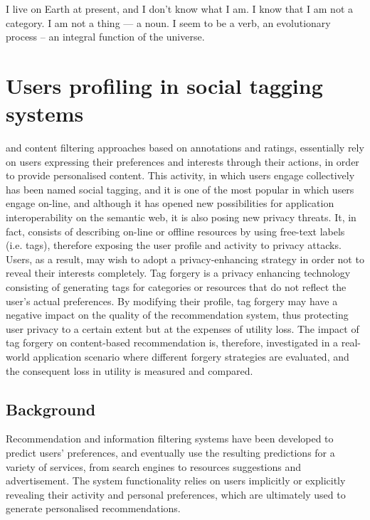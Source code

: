 \begin{savequote}[75mm] 
I live on Earth at present, and I don’t know what I am. I know that I am not a category. I am not a thing — a noun. I seem to be a verb, an evolutionary process – an integral function of the universe.
\end{savequote}

\chapter{Users profiling in social tagging systems}

 and content filtering approaches based on annotations and ratings, essentially rely on users expressing their preferences and interests through their actions, in order to provide personalised content. This activity, in which users engage collectively has been named social tagging, and it is one of the most popular in which users engage on-line, and although it has opened new possibilities for application interoperability on the semantic web, it is also posing new privacy threats. It, in fact, consists of describing on-line or offline resources by using free-text labels (i.e. tags), therefore exposing the user profile and activity to privacy attacks. Users, as a result, may wish to adopt a privacy-enhancing strategy in order not to reveal their interests completely. Tag forgery is a privacy enhancing technology consisting of generating tags for categories or resources that do not reflect the user's actual preferences. By modifying their profile, tag forgery may have a negative impact on the quality of the recommendation system, thus protecting user privacy to a certain extent but at the expenses of utility loss. The impact of tag forgery on content-based recommendation is, therefore, investigated in a real-world application scenario where different forgery strategies are evaluated, and the consequent loss in utility is measured and compared.

\section{Background}

Recommendation and information filtering systems have been developed to predict users' preferences, and eventually use the resulting predictions for a variety of services, from search engines to resources suggestions and advertisement. The system functionality relies on users implicitly or explicitly revealing their activity and personal preferences, which are ultimately used to generate personalised recommendations.

